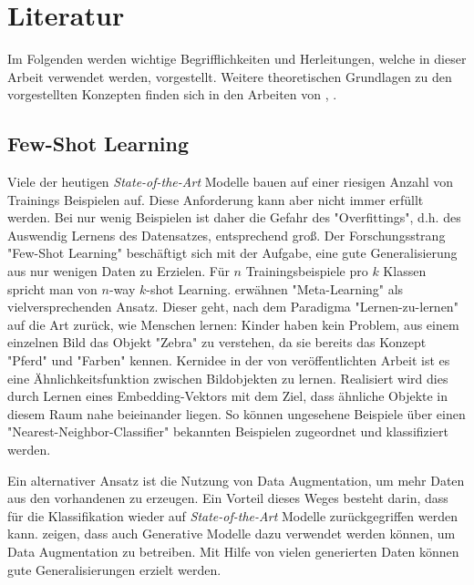 \chapter{Literatur}
Im Folgenden werden wichtige Begrifflichkeiten und Herleitungen, welche in dieser Arbeit verwendet werden, vorgestellt. Weitere theoretischen Grundlagen zu den vorgestellten Konzepten finden sich in den Arbeiten von \cite{Goodfellow-et-al-2016}, \cite{Kingma2014}.


\section{Few-Shot Learning}
Viele der heutigen \textit{State-of-the-Art} Modelle bauen auf einer riesigen Anzahl von Trainings Beispielen auf. Diese Anforderung kann aber nicht immer erfüllt werden. Bei nur wenig Beispielen ist daher die Gefahr des "Overfittings", d.h. des Auswendig Lernens des Datensatzes, entsprechend groß. Der Forschungsstrang "Few-Shot Learning" beschäftigt sich mit der Aufgabe, eine gute Generalisierung aus nur wenigen Daten zu Erzielen. Für $n$ Trainingsbeispiele pro $k$ Klassen spricht man von $n$-way $k$-shot Learning. \cite{Sung2017} erwähnen "Meta-Learning" als vielversprechenden Ansatz. Dieser geht, nach dem Paradigma "Lernen-zu-lernen" auf die Art zurück, wie Menschen lernen: Kinder haben kein Problem, aus einem einzelnen Bild das Objekt "Zebra" zu verstehen, da sie bereits das Konzept "Pferd" und "Farben" kennen. Kernidee in der von \cite{Sung2017} veröffentlichten Arbeit ist es eine Ähnlichkeitsfunktion zwischen Bildobjekten zu lernen. Realisiert wird dies durch Lernen eines Embedding-Vektors mit dem Ziel, dass ähnliche Objekte in diesem Raum nahe beieinander liegen. So können ungesehene Beispiele über einen "Nearest-Neighbor-Classifier" bekannten Beispielen zugeordnet und klassifiziert werden.

Ein alternativer Ansatz ist die Nutzung von Data Augmentation, um mehr Daten aus den vorhandenen zu erzeugen. Ein Vorteil dieses Weges besteht darin, dass für die Klassifikation wieder auf \textit{State-of-the-Art} Modelle zurückgegriffen werden kann. \cite{Antoniou2017} zeigen, dass auch Generative Modelle dazu verwendet werden können, um Data Augmentation zu betreiben. Mit Hilfe von vielen generierten Daten können gute Generalisierungen erzielt werden.



